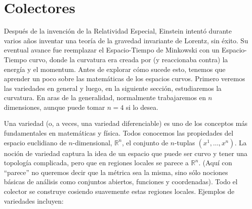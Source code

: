 \documentclass[11pt,b5paper,openany,twoside]{book}
\begin{document}
\chapter{Colectores}


Después de la invención de la Relatividad Especial, Einstein intentó durante varios años inventar una teoría de la gravedad invariante de Lorentz, sin éxito.
Su eventual avance fue reemplazar el Espacio-Tiempo de Minkowski con un Espacio-Tiempo curvo, donde la curvatura era creada por (y reaccionaba contra) la energía y el momentum.
Antes de explorar cómo sucede esto, tenemos que aprender un poco sobre las matemáticas de los espacios curvos.
Primero veremos las variedades en general y luego, en la siguiente sección, estudiaremos la curvatura.
En aras de la generalidad, normalmente trabajaremos en $n$ dimensiones, aunque puede tomar $n=4$ si lo desea.

Una variedad (o, a veces, una variedad diferenciable) es uno de los conceptos más fundamentales en matemáticas y física.
Todos conocemos las propiedades del espacio euclidiano de $n$-dimensional, $\mathbb{R}^n$, el conjunto de $n$-tuplas $(x^1,\ldots,x^n)$.
La noción de variedad captura la idea de un espacio que puede ser curvo y tener una topología complicada, pero que en regiones locales se parece a $\mathbb{R}^n$.
(Aquí con ``parece'' no queremos decir que la métrica sea la misma, sino sólo nociones básicas de análisis como conjuntos abiertos, funciones y coordenadas).
Todo el colector se construye cosiendo suavemente estas regiones locales.
Ejemplos de variedades incluyen:
\end{document}
